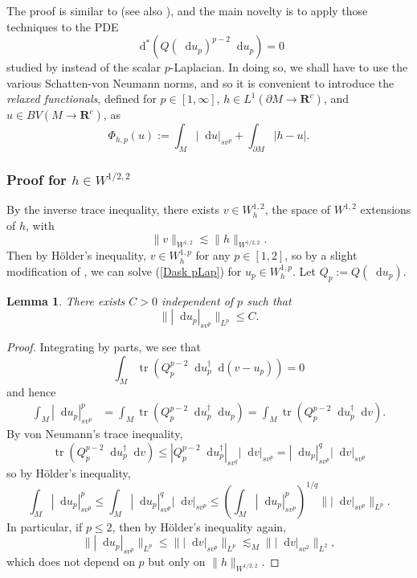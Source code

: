 \documentclass[reqno,11pt]{amsart}
\newcommand{\RR}{\mathbf{R}}
\newcommand*\dif{\mathop{}\!\mathrm{d}}
\DeclareMathOperator{\tr}{tr}
\newcommand{\dfn}[1]{\emph{#1}\index{#1}}
\newtheorem{lemma}[theorem]{Lemma}
\theoremstyle{definition}
\numberwithin{equation}{section}
\begin{document}
The proof is similar to \cite[Theorem 2.4]{Mazon14} (see also \cite[Proposition 5.9]{Andreu-Vaillo2004}), and the main novelty is to apply those techniques to the PDE 
\begin{equation}\label{Dask pLap}
\dif^* (Q(\dif u_p)^{p - 2} \dif u_p) = 0
\end{equation}
studied by \cite{daskalopoulos2022analytic} instead of the scalar $p$-Laplacian.
In doing so, we shall have to use the various Schatten-von Neumann norms, and so it is convenient to introduce the \dfn{relaxed functionals}, defined for $p \in [1, \infty]$, $h \in L^1(\partial M \to \RR^c)$, and $u \in BV(M \to \RR^c)$, as
$$\Phi_{h, p}(u) := \int_M |\dif u|_{sv^p} + \int_{\partial M} |h - u|.$$

\subsubsection{Proof for \texorpdfstring{$h \in W^{1/2, 2}$}{regular h}}
By the inverse trace inequality, there exists $v \in W^{1, 2}_h$, the space of $W^{1, 2}$ extensions of $h$, with 
$$\|v\|_{W^{1, 2}} \lesssim \|h\|_{W^{1/2, 2}}.$$
Then by H\"older's inequality, $v \in W^{1, p}_h$ for any $p \in [1, 2]$, so by a slight modification of \cite[Theorem 2.12]{daskalopoulos2022analytic}, we can solve (\ref{Dask pLap}) for $u_p \in W^{1, p}_h$.
Let $Q_p := Q(\dif u_p)$.

\begin{lemma}
There exists $C > 0$ independent of $p$ such that 
$$\||\dif u_p|_{sv^p}\|_{L^p} \leq C.$$
\end{lemma}
\begin{proof}
Integrating by parts, we see that 
$$\int_M \tr(Q_p^{p - 2} \dif u_p^\dagger \dif(v - u_p)) = 0$$
and hence
\begin{align*}
\int_M |\dif u_p|_{sv^p}^p
&= \int_M \tr(Q_p^{p - 2} \dif u_p^\dagger \dif u_p)
= \int_M \tr(Q_p^{p - 2} \dif u_p^\dagger \dif v).
\end{align*}
By von Neumann's trace inequality,
$$\tr(Q_p^{p - 2} \dif u_p^\dagger \dif v) \leq |Q_p^{p - 2} \dif u_p^\dagger|_{sv^q} |\dif v|_{sv^p} = |\dif u_p|_{sv^p}^q |\dif v|_{sv^p}$$
so by H\"older's inequality,
$$\int_M |\dif u_p|_{sv^p}^p \leq \int_M |\dif u_p|_{sv^p}^q |\dif v|_{sv^p} \leq \left(\int_M |\dif u_p|_{sv^p}^p\right)^{1/q} \||\dif v|_{sv^p}\|_{L^p}.$$
In particular, if $p \leq 2$, then by H\"older's inequality again,
$$\||\dif u_p|_{sv^p}\|_{L^p} \leq \||\dif v|_{sv^p}\|_{L^p} \lesssim_M \||\dif v|_{sv^2}\|_{L^2},$$
which does not depend on $p$ but only on $\|h\|_{W^{1/2, 2}}$.
\end{proof}
\end{document}
